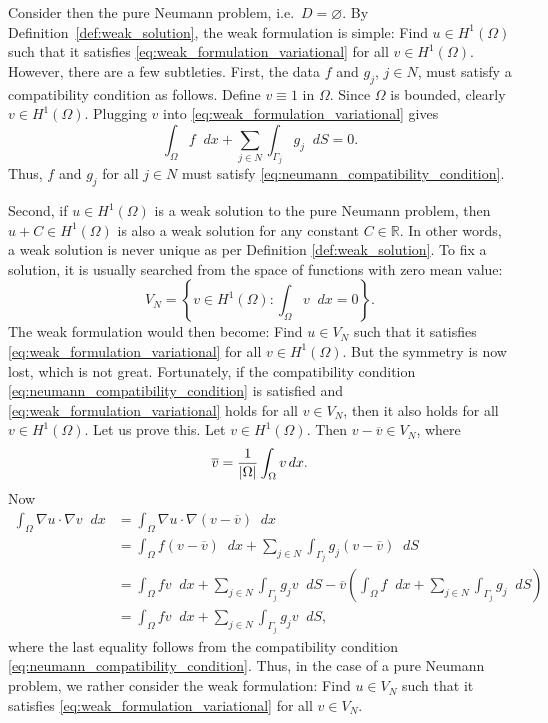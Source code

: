 \documentclass[english, 12pt, a4paper, sci, utf8, a-2b, online]{aaltothesis}
\theoremstyle{definition}
\theoremstyle{plain}
\DeclarePairedDelimiter\abs{\lvert}{\rvert}
\newcommand*\diff{\mathop{}\!d}
\numberwithin{equation}{section}
\begin{document}
Consider then the pure Neumann problem, i.e.\ $D = \varnothing$.
By Definition~\ref{def:weak_solution}, the weak formulation is simple:
Find $u \in H^1(\Omega)$ such that it satisfies 
\eqref{eq:weak_formulation_variational} for all $v \in H^1(\Omega)$.
However, there are a few subtleties.
First, the data $f$ and $g_j$, $j \in N$,
must satisfy a compatibility condition as follows.
Define $v \equiv 1$ in $\Omega$. Since $\Omega$ is bounded, clearly
$v \in H^1(\Omega)$. Plugging $v$ into \eqref{eq:weak_formulation_variational}
gives
\begin{equation}
    \label{eq:neumann_compatibility_condition}
    \int_{\Omega} f \diff x + \sum_{j \in N} \int_{\Gamma_j} g_j \diff S = 0.
\end{equation}
Thus, $f$ and $g_j$ for all $j \in N$
must satisfy \eqref{eq:neumann_compatibility_condition}.

Second, if $u \in H^1(\Omega)$ is a weak solution to the pure Neumann problem,
then $u + C \in H^1(\Omega)$ is also a weak solution for any constant
$C \in \mathbb{R}$.
In other words, a weak solution is never unique as per Definition
\ref{def:weak_solution}. To fix a solution,
it is usually searched from the space of functions with zero mean value:
\begin{equation*}
    V_N = \left\{ v \in H^1(\Omega) : \int_{\Omega} v \diff x = 0 \right\}.
\end{equation*}
The weak formulation would then become: Find $u \in V_N$ such that it satisfies
\eqref{eq:weak_formulation_variational} for all $v \in H^1(\Omega)$.
But the symmetry is now lost, which is not great.
Fortunately, if the compatibility condition 
\eqref{eq:neumann_compatibility_condition} is
satisfied and \eqref{eq:weak_formulation_variational} holds for all
$v \in V_N$, then it also holds for all $v \in H^1(\Omega)$.
Let us prove this. Let $v \in H^1(\Omega)$. Then $v - \overline{v} \in V_N$, where
\begin{align*}
    \overline{v} = \frac{1}{\abs{\Omega}} \int_{\Omega} v \diff x.
\end{align*}
Now
\begin{align*}
    \int_{\Omega} \nabla u \cdot \nabla v \diff x
    &= \int_{\Omega} \nabla u \cdot \nabla (v - \overline{v}) \diff x \\
    &= \int_{\Omega} f (v - \overline{v}) \diff x
        + \sum_{j \in N} \int_{\Gamma_j} g_j (v - \overline{v}) \diff S \\
    &= \int_{\Omega} f v \diff x + \sum_{j \in N} \int_{\Gamma_j} g_j v \diff S
        - \overline{v} \left( \int_{\Omega} f \diff x
            + \sum_{j \in N} \int_{\Gamma_j} g_j \diff S \right) \\
    &= \int_{\Omega} f v \diff x + \sum_{j \in N} \int_{\Gamma_j} g_j v \diff S,
\end{align*}
where the last equality follows from the compatibility condition
\eqref{eq:neumann_compatibility_condition}.
Thus, in the case of a pure Neumann problem,
we rather consider the weak formulation:
Find $u \in V_N$ such that it satisfies \eqref{eq:weak_formulation_variational}
for all $v \in V_N$.
\end{document}
